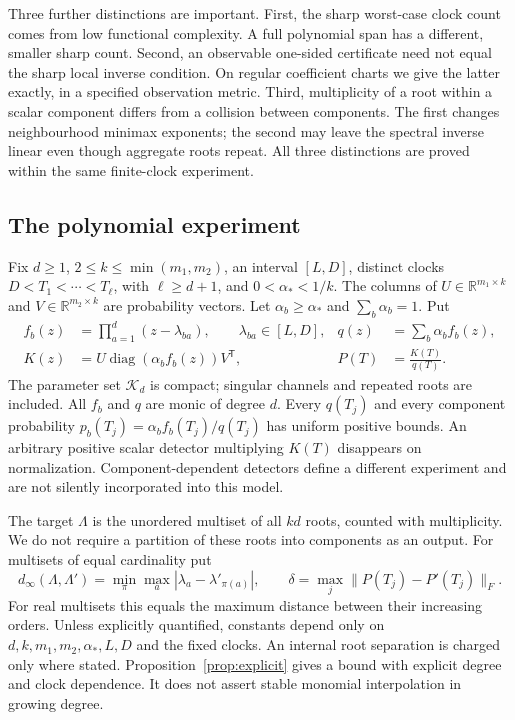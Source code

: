 \documentclass[11pt,reqno]{amsart}
\numberwithin{equation}{section}
\theoremstyle{definition}\newtheorem{definition}[theorem]{Definition}
\theoremstyle{remark}\newtheorem{remark}[theorem]{Remark}
\newcommand{\R}{\mathbb R}
\newcommand{\diag}{\operatorname{diag}}
\newcommand{\cK}{\mathcal K}
\begin{document}
Three further distinctions are important. First, the sharp worst-case
clock count comes from low functional complexity. A full polynomial
span has a different, smaller sharp count. Second, an observable
one-sided certificate need not equal the sharp local inverse condition.
On regular coefficient charts we give the latter exactly, in a specified
observation metric. Third, multiplicity of a root within a scalar
component differs from a collision between components. The first changes
neighbourhood minimax exponents; the second may leave the spectral
inverse linear even though aggregate roots repeat. All three distinctions
are proved within the same finite-clock experiment.

\subsection{The polynomial experiment}
Fix $d\ge1$, $2\le k\le\min(m_1,m_2)$, an interval $[L,D]$, distinct
clocks $D<T_1<\cdots<T_\ell$, with $\ell\ge d+1$, and
$0<\alpha_*<1/k$. The columns of
$U\in\R^{m_1\times k}$ and $V\in\R^{m_2\times k}$ are probability
vectors. Let $\alpha_b\ge\alpha_*$ and $\sum_b\alpha_b=1$. Put
\begin{align}
 f_b(z)&=\prod_{a=1}^d(z-\lambda_{ba}),\qquad \lambda_{ba}\in[L,D],
       &q(z)&=\sum_b\alpha_b f_b(z),\nonumber\\
 K(z)&=U\diag(\alpha_b f_b(z))V^{\mathsf T},
       &P(T)&=\frac{K(T)}{q(T)}.                  \label{eq:model}
\end{align}
The parameter set $\cK_d$ is compact; singular channels and repeated
roots are included. All $f_b$ and $q$ are monic of degree $d$.
Every $q(T_j)$ and every component probability
$p_b(T_j)=\alpha_b f_b(T_j)/q(T_j)$ has uniform positive bounds.
An arbitrary positive scalar detector multiplying $K(T)$ disappears
on normalization. Component-dependent detectors define a different
experiment and are not silently incorporated into this model.

The target $\Lambda$ is the unordered multiset of all $kd$ roots,
counted with multiplicity. We do not require a partition of these roots
into components as an output. For multisets of equal cardinality put
\[
 d_\infty(\Lambda,\Lambda')=\min_\pi\max_a|\lambda_a-\lambda'_{\pi(a)}|,
 \qquad \delta=\max_j\|P(T_j)-P'(T_j)\|_F.
\]
For real multisets this equals the maximum distance between their
increasing orders. Unless explicitly quantified, constants depend only
on $d,k,m_1,m_2,\alpha_*,L,D$ and the fixed clocks. An internal root
separation is charged only where stated. Proposition~\ref{prop:explicit}
gives a bound with explicit degree and clock dependence. It does not
assert stable monomial interpolation in growing degree.
\end{document}
